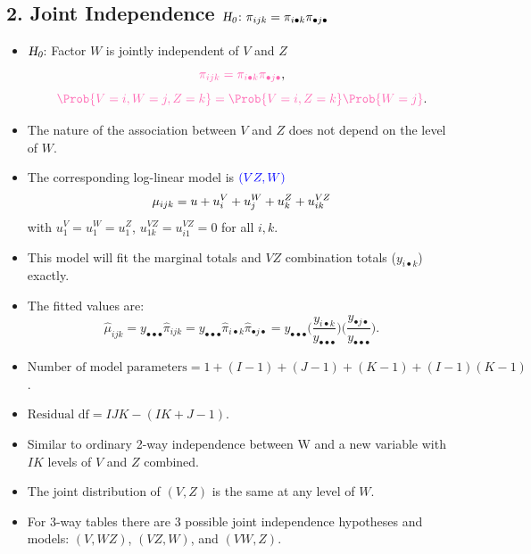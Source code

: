 \documentclass{article}\usepackage[]{graphicx}\usepackage[svgnames]{xcolor}
\let\log\relax%
\newcommand{\HN}{\textsl{H}_{\textsl{0}}}%
\begin{document}
\subsection*{2. Joint Independence $ \HN\colon \pi_{ijk}=\pi_{i\bullet k}\pi_{\bullet j\bullet} $}
\begin{itemize}
      \item $ \HN $: Factor $ W $ is jointly independent of $ V $ and $ Z $
            \[ \textcolor{HotPink}{\pi_{ijk}=\pi_{i\bullet k}\pi_{\bullet j\bullet}}, \]
            \[ \textcolor{HotPink}{\Prob{V=i,W=j,Z=k}=\Prob{V=i,Z=k}\Prob{W=j}}. \]
      \item The nature of the association between $ V $ and $ Z $ does not depend on the level of $ W $.
      \item The corresponding log-linear model is $ \textcolor{Blue}{(VZ,W)} $
            \[ \log{\mu_{ijk}}=u+u_i^V+u_j^W+u_k^Z+u_{ik}^{VZ} \]
            with $ u_1^V=u_1^W=u_1^Z $, $ u_{1k}^{VZ}=u_{i1}^{VZ}=0 $ for all $ i,k $.
      \item This model will fit the marginal totals and $ VZ $ combination totals ($ y_{i\bullet k} $) exactly.
      \item The fitted values are:
            \[ \hat{\mu}_{ijk}=y_{\bullet\bullet\bullet}\hat{\pi}_{ijk}=y_{\bullet\bullet\bullet}\hat{\pi}_{i\bullet k}\hat{\pi}_{\bullet j\bullet}=y_{\bullet\bullet\bullet}\biggl(\frac{y_{i\bullet k}}{y_{\bullet\bullet\bullet}}\biggr)\biggl(\frac{y_{\bullet j\bullet}}{y_{\bullet\bullet\bullet}}\biggr). \]
      \item $ \text{Number of model parameters}=1 + (I - 1) + (J - 1) + (K - 1) + (I - 1)(K - 1) $.
      \item $ \text{Residual df}=IJK-(IK+J-1) $.
      \item Similar to ordinary 2-way independence between W and a new variable with $IK$
            levels of $V$ and $Z$ combined.
      \item The joint distribution of $(V,Z)$ is the same at any level of $W$.
      \item For 3-way tables there are 3 possible joint independence hypotheses and models:
            $(V,WZ)$, $(VZ,W)$, and $(VW,Z)$.
\end{itemize}
\end{document}
